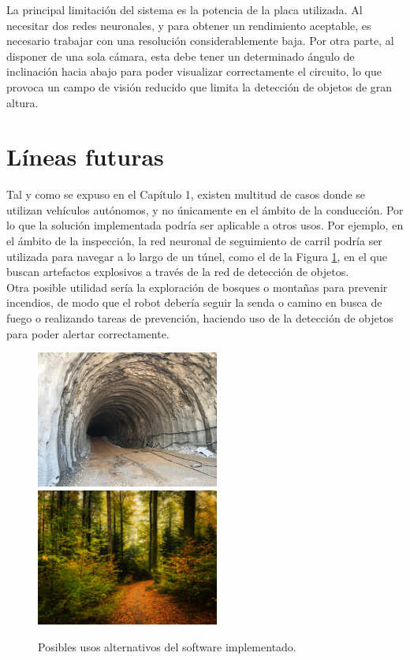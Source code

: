 La principal limitación del sistema es la potencia de la placa utilizada. Al necesitar dos redes neuronales, y para obtener un rendimiento aceptable, es necesario trabajar con una resolución considerablemente baja. Por otra parte, al disponer de una sola cámara, esta debe tener un determinado ángulo de inclinación hacia abajo para poder visualizar correctamente el circuito, lo que provoca un campo de visión reducido que limita la detección de objetos de gran altura.

\section{Líneas futuras}
\label{section:future}
Tal y como se expuso en el Capítulo 1, existen multitud de casos donde se utilizan vehículos autónomos, y no únicamente en el ámbito de la conducción. Por lo que la solución implementada podría ser aplicable a otros usos. Por ejemplo, en el ámbito de la inspección, la red neuronal de seguimiento de carril podría ser utilizada para navegar a lo largo de un túnel, como el de la Figura \ref{fig:moreusages}, en el que buscan artefactos explosivos a través de la red de detección de objetos.\\

Otra posible utilidad sería la exploración de bosques o montañas para prevenir incendios, de modo que el robot debería seguir la senda o camino en busca de fuego o realizando tareas de prevención, haciendo uso de la detección de objetos para poder alertar correctamente.

\begin{figure} [h!]
	\begin{center}
		\includegraphics[width=6cm]{figs/tunel}\hspace{0.5cm}\includegraphics[width=6cm]{figs/forest}
	\end{center}
	\caption{Posibles usos alternativos del software implementado.}
	\label{fig:moreusages}
\end{figure}\

